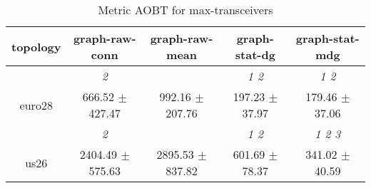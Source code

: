 \begin{table}[h]
\caption{Metric AOBT for max-transceivers}

        \centering
        \begin{tabular}{
        ccccc} \toprule 
 topology& graph-raw-conn & graph-raw-mean & graph-stat-dg & graph-stat-mdg \\ \toprule
 & \cellcolor[HTML]{EFEFEF} \textit{ 2 }& \cellcolor[HTML]{EFEFEF} & \cellcolor[HTML]{EFEFEF} \textit{ 1 2 }& \cellcolor[HTML]{EFEFEF} \textit{ 1 2 } \\ 
 {euro28}& \cellcolor[HTML]{EFEFEF} 666.52 $\pm$ 427.47& \cellcolor[HTML]{EFEFEF} 992.16 $\pm$ 207.76& \cellcolor[HTML]{EFEFEF} 197.23 $\pm$ 37.97& \cellcolor[HTML]{EFEFEF} 179.46 $\pm$ 37.06 \\ 
& \cellcolor[HTML]{EFEFEF} \textit{ 2 }& \cellcolor[HTML]{EFEFEF} & \cellcolor[HTML]{EFEFEF} \textit{ 1 2 }& \cellcolor[HTML]{EFEFEF} \textit{ 1 2 3 } \\ 
 {us26}& \cellcolor[HTML]{EFEFEF} 2404.49 $\pm$ 575.63& \cellcolor[HTML]{EFEFEF} 2895.53 $\pm$ 837.82& \cellcolor[HTML]{EFEFEF} 601.69 $\pm$ 78.37& \cellcolor[HTML]{EFEFEF} 341.02 $\pm$ 40.59 \\ 

        \bottomrule
        \end{tabular}%

        \end{table}
        
